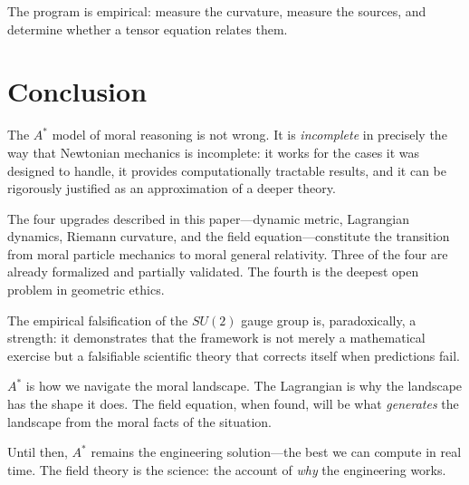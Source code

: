 \documentclass[12pt,letterpaper]{article}
\theoremstyle{definition}
\begin{document}
The program is empirical: measure the curvature, measure the sources, and determine whether a tensor equation relates them.


\section{Conclusion}
\label{sec:conclusion}

The $A^*$ model of moral reasoning is not wrong. It is \emph{incomplete} in precisely the way that Newtonian mechanics is incomplete: it works for the cases it was designed to handle, it provides computationally tractable results, and it can be rigorously justified as an approximation of a deeper theory.

The four upgrades described in this paper---dynamic metric, Lagrangian dynamics, Riemann curvature, and the field equation---constitute the transition from moral particle mechanics to moral general relativity. Three of the four are already formalized and partially validated. The fourth is the deepest open problem in geometric ethics.

The empirical falsification of the $SU(2)$ gauge group is, paradoxically, a strength: it demonstrates that the framework is not merely a mathematical exercise but a falsifiable scientific theory that corrects itself when predictions fail.

$A^*$ is how we navigate the moral landscape. The Lagrangian is why the landscape has the shape it does. The field equation, when found, will be what \emph{generates} the landscape from the moral facts of the situation.

Until then, $A^*$ remains the engineering solution---the best we can compute in real time. The field theory is the science: the account of \emph{why} the engineering works.



\end{document}
